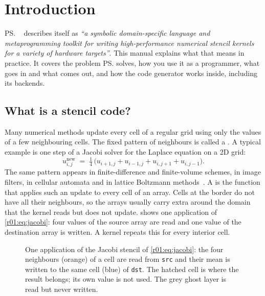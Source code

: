 \chapter{Introduction}\label{r01:ch:introduction}

\ps{}~\cite{pystencils} describes itself as \emph{``a symbolic domain-specific language
and metaprogramming toolkit for writing high-performance numerical stencil kernels for a
variety of hardware targets''}. This manual explains what that means in practice. It
covers the problem \ps{} solves, how you use it as a programmer, what goes in and what
comes out, and how the code generator works inside, including its backends.

\section{What is a stencil code?}

Many numerical methods update every cell of a regular grid using only the values of a
few neighbouring cells. The fixed pattern of neighbours is called a . A
typical example is one step of a Jacobi solver for the Laplace equation on a 2D grid:
\begin{equation}
  u^{\text{new}}_{i,j} \;=\; \tfrac14\,\bigl(u_{i+1,j} + u_{i-1,j} + u_{i,j+1} + u_{i,j-1}\bigr).
  \label{r01:eq:jacobi}
\end{equation}
The same pattern appears in finite-difference and finite-volume schemes, in image
filters, in cellular automata and in lattice Boltzmann methods~\cite{lbmpy}. A
 is the function that applies such an update to every cell of an
array. Cells at the border do not have all their neighbours, so the arrays usually carry
extra  around the domain that the kernel reads but does not update.
 shows one application of \cref{r01:eq:jacobi}: four values of the
source array are read and one value of the destination array is written. A kernel
repeats this for every interior cell.

\begin{figure}[htbp]
  \centering
  
  \caption[One application of the Jacobi stencil]{One application of the Jacobi stencil of \cref{r01:eq:jacobi}: the four neighbours (orange) of a cell are read from \texttt{src} and their mean is written to the same cell (blue) of \texttt{dst}. The hatched cell is where the result belongs; its own value is not used. The grey ghost layer is read but never written.}
  \label{r01:fig:stencil}
\end{figure}

